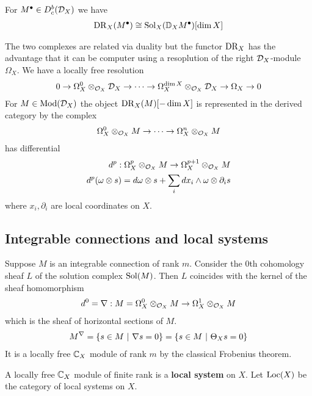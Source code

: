 \begin{proposition}
	For $M^\bullet \in D^b_c({\mathcal{D}}_X)$ we have \begin{align*}
		\operatorname{DR}_X(M^\bullet) \cong \operatorname{Sol}_X(\mathbb{D}_X M^\bullet)[\dim X]
	\end{align*}
\end{proposition}
The two complexes are related via duality but the functor $\operatorname{DR}_X$ has
the advantage that it can be computer using a resoplution of the right
${\mathcal{D}}_X$-module $\Omega_X$. We have a locally free resolution
\begin{align*}
	0 \to \Omega_X^0 \otimes_{{\mathcal{O}}_X} {\mathcal{D}}_X \to \dots \to \Omega_X^{\dim X} \otimes_{{\mathcal{O}}_X} {\mathcal{D}}_X \to \Omega_X \to 0
\end{align*} For $M\in\operatorname{Mod}({\mathcal{D}}_X)$ the object
$\operatorname{DR}_X(M)[-\dim X]$ is represented in the derived category by the complex \begin{align*}
	\Omega_X^0\otimes_{{\mathcal{O}}_X} M \to \dots \to \Omega_X^n\otimes_{{\mathcal{O}}_X} M
\end{align*} has differential \begin{align*}
	d^p: \Omega_X^p\otimes_{{\mathcal{O}}_X} M \to \Omega_X^{p+1}\otimes_{{\mathcal{O}}_X} M \\
	d^p(\omega\otimes s) = d\omega\otimes s + \sum_i dx_i \wedge \omega \otimes \partial_i s
\end{align*} where $x_i,\partial_i$ are local coordinates on $X$.

\subsection{Integrable connections and local systems}
Suppose $M$ is an integrable connection of rank $m$. Consider
the $0$th cohomology sheaf $L$ of the solution complex $\operatorname{Sol}(M)$.
Then $L$ coincides with the kernel of the sheaf homomorphism \begin{align*}
	d^0 = \nabla: M = \Omega_X^0 \otimes_{{\mathcal{O}}_X} M  \to \Omega_X^1 \otimes_{{\mathcal{O}}_X} M
\end{align*} which is
the sheaf of horizontal sections of $M$. \begin{align*}
	M^{\nabla} =  \{s\in M \ \vert \  \nabla s = 0\} = \{s\in M \ \vert \  \Theta_X s = 0\}
\end{align*} It is a locally free $\mathbb{C}_X$ module of rank $m$ by the classical Frobenius theorem.

\begin{definition}
	A locally free $\mathbb{C}_X$ module of finite rank is a \textbf{local system} on $X$.
	Let $\operatorname{Loc}(X)$ be the category of local systems on $X$.
\end{definition}

